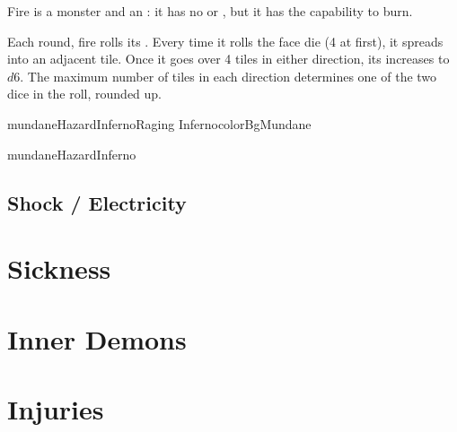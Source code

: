 Fire is a monster and an : it has no  or ,
but it has the capability to burn.


Each round, fire rolls its . Every time it rolls the face die (4 at first),
it spreads into an adjacent tile.
Once it goes over 4 tiles in either direction, its  increases to $d6$.
The maximum number of tiles in each direction determines one of the two dice in the  roll, rounded up.
\\




\begin{actorCardMiniAmerican}{mundaneHazardInferno}{Raging Inferno}{colorBgMundane}
	\begin{natureBox}{mundaneHazardInferno}
	\end{natureBox}
\end{actorCardMiniAmerican}





\subsection{Shock / Electricity}




\section{Sickness}

\section{Inner Demons}

\section{Injuries}

